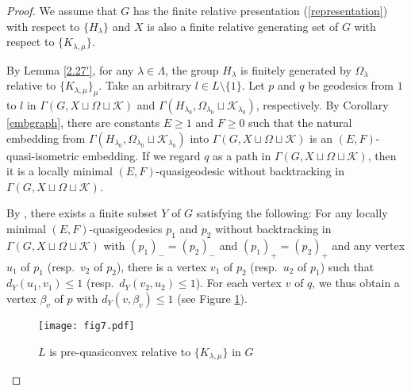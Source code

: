 \documentclass{amsart}
\theoremstyle{definition}
\begin{document}
\begin{proof}
We assume that $G$ has the finite relative presentation (\ref{representation}) with respect to $\{H_\lambda\}$ and $X$ is also a finite relative generating set of $G$ with respect to $\{K_{\lambda,\mu}\}$. 

By Lemma \ref{2.27'}, for any $\lambda\in\Lambda$, the group $H_\lambda$ is finitely generated by $\Omega_\lambda$ relative to $\{K_{\lambda,\mu}\}_\mu$. 
Take an arbitrary $l\in L\setminus \{1\}$. 
Let $p$ and $q$ be geodesics from $1$ to $l$ in $\Gamma(G,X\sqcup\Omega\sqcup{\mathcal K})$ and $\Gamma(H_{\lambda_0},\Omega_{\lambda_0}\sqcup{\mathcal K}_{\lambda_0})$, respectively. 
By Corollary \ref{embgraph}, there are constants $E\geq 1$ and $F\geq 0$ such that the natural embedding from $\Gamma(H_{\lambda_0}, \Omega_{\lambda_0}\sqcup{\mathcal K}_{\lambda_0})$ into $\Gamma(G,X\sqcup\Omega\sqcup{\mathcal K})$ is an $(E,F)$-quasi-isometric embedding. 
If we regard $q$ as a path in $\Gamma(G,X\sqcup\Omega\sqcup{\mathcal K})$, then it is a locally minimal $(E,F)$-quasigeodesic without backtracking in $\Gamma(G,X\sqcup\Omega\sqcup{\mathcal K})$. 

By \cite[Theorem 2.14]{MP08}, there exists a finite subset $Y$ of $G$ satisfying the following:
For any locally minimal $(E,F)$-quasigeodesics $p_1$ and $p_2$ without backtracking in $\Gamma(G,X\sqcup\Omega\sqcup{\mathcal K})$ with $(p_1)_-=(p_2)_-$ and $(p_1)_+=(p_2)_+$ and any vertex $u_1$ of $p_1$ (resp.\ $v_2$ of $p_2$), there is a vertex $v_1$ of $p_2$ (resp.\ $u_2$ of $p_1$) such that $d_Y(u_1,v_1)\leq 1$ (resp.\ $d_Y(v_2,u_2)\leq 1$). 
For each vertex $v$ of $q$, we thus obtain a vertex $\beta_v$ of $p$ with $d_Y(v,\beta_v)\leq 1$ (see Figure \ref{fig7}). 

\begin{figure}[top]
\begin{center}
\texttt{[image: fig7.pdf]}
\end{center}
\caption{$L$ is pre-quasiconvex relative to $\{K_{\lambda,\mu}\}$ in $G$}
\label{fig7}
\end{figure}


\end{proof}
\end{document}

